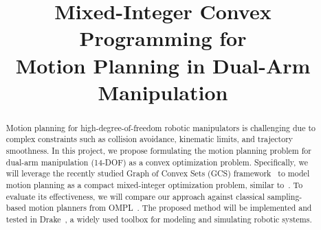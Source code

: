 \documentclass[conference]{IEEEtran}
\begin{document}
\title{Mixed-Integer Convex Programming for \\Motion Planning in Dual-Arm Manipulation}

\author{
}

\maketitle

\begin{abstract}
Motion planning for high-degree-of-freedom robotic manipulators is challenging due to complex constraints such as collision avoidance, kinematic limits, and trajectory smoothness.
%
In this project, we propose formulating the motion planning problem for dual-arm manipulation (14-DOF) as a convex optimization problem.
%
Specifically, we will leverage the recently studied Graph of Convex Sets (GCS) framework~\cite{marcucci2024shortest} to model motion planning as a compact mixed-integer optimization problem, similar to~\cite{marcucci2023motion}.
%
To evaluate its effectiveness, we will compare our approach against classical sampling-based motion planners from OMPL~\cite{sucan2012open}.
%
The proposed method will be implemented and tested in Drake~\cite{drake}, a widely used toolbox for modeling and simulating robotic systems.
\end{abstract}








\end{document}
